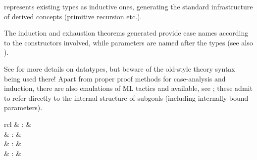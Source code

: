 \begin{isabellebody}
\begin{isamarkuptext}
\begin{description}
  \item \hyperlink{command.HOL.rep-datatype}{\mbox{}} represents existing types as
  inductive ones, generating the standard infrastructure of derived
  concepts (primitive recursion etc.).

  \end{description}

  The induction and exhaustion theorems generated provide case names
  according to the constructors involved, while parameters are named
  after the types (see also ).

  See \cite{isabelle-HOL} for more details on datatypes, but beware of
  the old-style theory syntax being used there!  Apart from proper
  proof methods for case-analysis and induction, there are also
  emulations of ML tactics \hyperlink{method.HOL.case-tac}{\mbox{}} and \hyperlink{method.HOL.induct-tac}{\mbox{}} available, see ; these admit
  to refer directly to the internal structure of subgoals (including
  internally bound parameters).%
\end{isamarkuptext}%
\isamarkuptrue%
%
\isamarkuptrue%
%
\begin{isamarkuptext}%
\begin{matharray}{rcl}
    \hypertarget{command.HOL.primrec}{\hyperlink{command.HOL.primrec}{\mbox{}}} & : &  \\
    \hypertarget{command.HOL.fun}{\hyperlink{command.HOL.fun}{\mbox{}}} & : &  \\
    \hypertarget{command.HOL.function}{\hyperlink{command.HOL.function}{\mbox{}}} & : &  \\
    \hypertarget{command.HOL.termination}{\hyperlink{command.HOL.termination}{\mbox{}}} & : &  \\
  \end{matharray}


\end{isamarkuptext}
\end{isabellebody}
